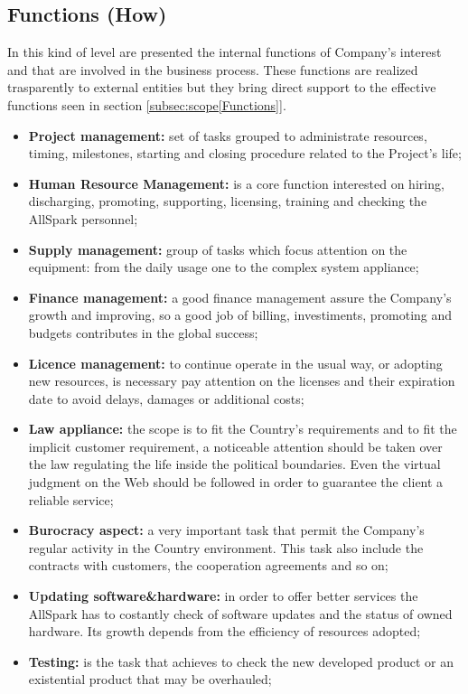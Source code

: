 \subsection{Functions (How)}
\label{subsec:enterprise[Functions]}
In this kind of level are presented the internal functions of Company's interest and that are involved in the business process. These functions are realized trasparently to external entities but they bring direct support to the effective functions seen in section \ref{subsec:scope[Functions]}.
\begin{itemize}
  \item {\bf Project management:} set of tasks grouped to administrate resources, timing, milestones, starting and closing procedure related to the Project's life;
  \item {\bf Human Resource Management:} is a core function interested on hiring, discharging, promoting, supporting, licensing, training and checking the AllSpark personnel;
  \item {\bf Supply management:} group of tasks which focus attention on the equipment: from the daily usage one to the complex system appliance;
  \item {\bf Finance management:} a good finance management assure the Company's growth and improving, so a good job of billing, investiments, promoting and budgets contributes in the global success;
  \item {\bf Licence management:} to continue operate in the usual way, or adopting new resources, is necessary pay attention on the licenses and their expiration date to avoid delays, damages or additional costs;
  \item {\bf Law appliance:} the scope is to fit the Country's requirements and to fit the implicit customer requirement, a noticeable attention should be taken over the law regulating the life inside the political boundaries. Even the virtual judgment on the Web should be followed in order to guarantee the client a reliable service;
  \item {\bf Burocracy aspect:} a very important task that permit the Company's regular activity in the Country environment. This task also include the contracts with customers, the cooperation agreements and so on;
  \item {\bf Updating software\&hardware:} in order to offer better services the AllSpark has to costantly check of software updates and the status of owned hardware. Its growth depends from the efficiency of resources adopted;
  \item {\bf Testing:} is the task that achieves to check the new developed product or an existential product that may be overhauled;

\end{itemize}

